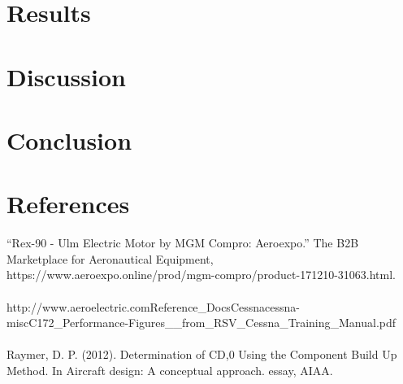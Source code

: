 \documentclass[12pt,A4paper]{article}
\begin{document}
	\section{Results}
	\clearpage
	\section{Discussion}
	\clearpage
	\section{Conclusion}
	\clearpage
	\section{References}
	\sloppy
	“Rex-90 - Ulm Electric Motor by MGM Compro: Aeroexpo.” The B2B Marketplace for Aeronautical Equipment, https://www.aeroexpo.online/prod/mgm-compro/product-171210-31063.html. \\ \\
	http://www.aeroelectric.com\/Reference\_Docs\/Cessna\/cessna-misc\/C172\_Performance-Figures\_\_from\_RSV\_Cessna\_Training\_Manual.pdf \\ \\
	Raymer, D. P. (2012). Determination of CD,0 Using the Component Build Up Method. In Aircraft design: A conceptual approach. essay, AIAA. \\
	\clearpage
\end{document}
